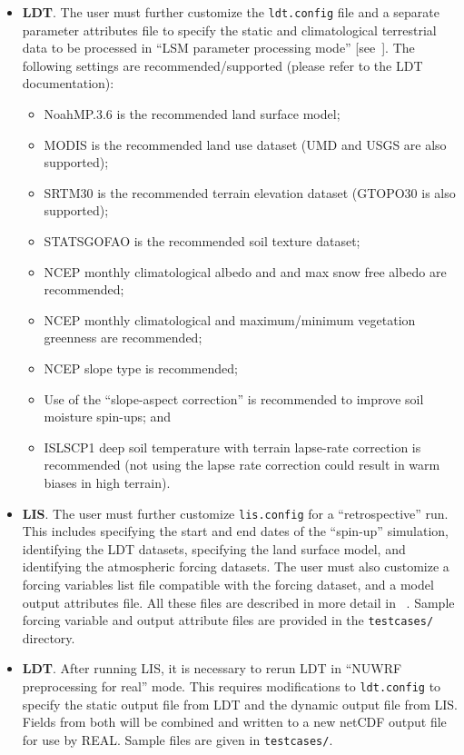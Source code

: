 \begin{itemize}
\item \textbf{LDT}. The user must further customize the \texttt{ldt.config}
  file and a separate parameter attributes file to specify the static 
  and climatological terrestrial data to be processed in ``LSM parameter 
  processing mode'' [see~\cite{ref:LdtUserGuide}].  The 
  following settings are recommended/supported (please refer to the LDT documentation):
  \begin{itemize}
  \item NoahMP.3.6 is the recommended land surface model;
  \item MODIS is the recommended land use dataset (UMD and USGS are also 
    supported);
  \item SRTM30 is the recommended terrain elevation dataset (GTOPO30 is also
    supported);
  \item STATSGOFAO is the recommended soil texture dataset;
  \item NCEP monthly climatological albedo and and max snow free albedo are
    recommended;
  \item NCEP monthly climatological and maximum/minimum vegetation greenness
    are recommended; 
  \item NCEP slope type is recommended;
  \item Use of the ``slope-aspect correction'' is recommended to improve
    soil moisture spin-ups; and
  \item ISLSCP1 deep soil temperature with terrain lapse-rate correction is
    recommended (not using the lapse rate correction could result in warm
    biases in high terrain).
    
  \end{itemize}

\item \textbf{LIS}. The user must further customize \texttt{lis.config} for 
  a ``retrospective'' run.  This includes specifying the start and end dates 
  of the ``spin-up'' simulation, identifying the LDT datasets, specifying the 
  land surface model, and identifying the atmospheric forcing datasets. The 
  user must also customize a forcing variables list file compatible with
  the forcing dataset, and a model output attributes file. All these files
  are described in more detail in ~\cite{ref:LisUserGuide}.
  Sample forcing variable and output attribute files are provided in the
  \texttt{testcases/} directory.

\item \textbf{LDT}. After running LIS, it is necessary to rerun LDT in ``NUWRF
preprocessing for real'' mode. This requires modifications to 
\texttt{ldt.config} to specify the static output file from LDT and the dynamic
output file from LIS. Fields from both will be combined and written to a new
netCDF output file for use by REAL.  Sample files are given in 
\texttt{testcases/}.


\end{itemize}
